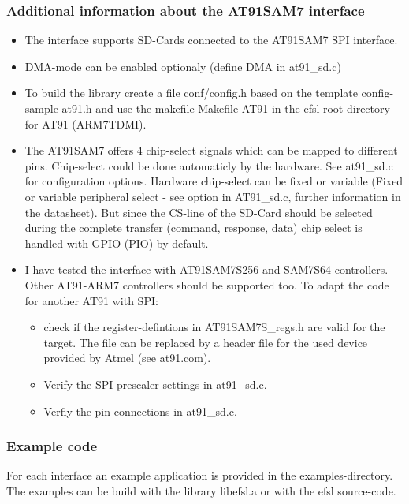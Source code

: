 \subsubsection{Additional information about the AT91SAM7 interface}
	\begin{itemize}
	
\item The interface supports SD-Cards connected 
to the AT91SAM7 SPI interface. 

\item DMA-mode can be enabled optionaly 
(define DMA in at91\_sd.c)

\item To build the library create a file 
conf/config.h based on the template 
config-sample-at91.h and use the 
makefile Makefile-AT91 in the
efsl root-directory for AT91 (ARM7TDMI).

\item The AT91SAM7 offers 4 chip-select
signals which can be mapped to
different pins. Chip-select could be 
done automaticly by the hardware. 
See at91_sd.c for configuration options.
Hardware chip-select can be fixed or variable
(Fixed or variable peripheral select - see 
option in AT91\_sd.c, further information 
in the datasheet). But since the CS-line
of the SD-Card should be selected during
the complete transfer (command, response, data)
chip select is handled with GPIO (PIO) by default.

\item I have tested the interface with  AT91SAM7S256 
and SAM7S64 controllers. Other AT91-ARM7 controllers 
should be supported too.
To adapt the code for another AT91 with SPI:
		\begin{itemize}
\item check if the register-defintions in AT91SAM7S\_regs.h 
are valid for the target. The file can be replaced
by a header file for the used device provided by Atmel  
(see at91.com).
\item Verify the SPI-prescaler-settings in at91_sd.c.
\item Verfiy the pin-connections in at91_sd.c.
		\end{itemize}
	\end{itemize}


\subsubsection{Example code}

For each interface an example application is provided in the 
examples-directory. The examples can be build with the library 
libefsl.a or with the efsl source-code.

